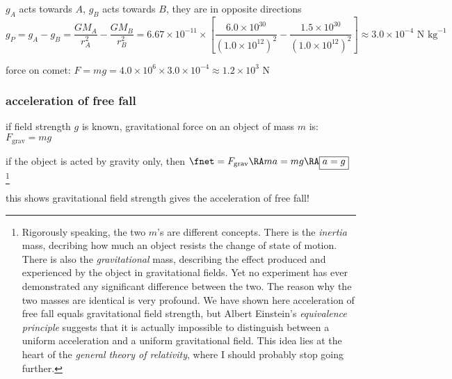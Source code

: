 \sol $g_A$ acts towards $A$, $g_B$ acts towards $B$, they are in opposite directions
\begin{equation*}
	g_P = g_A - g_B = \frac{GM_A}{r_A^2} - \frac{GM_B}{r_B^2} = 6.67\times10^{-11} \times\left[ \frac{6.0\times10^{30}}{(1.0\times10^{12})^2} - \frac{1.5\times10^{30}}{(1.0\times10^{12})^2}\right] \approx 3.0\times10^{-4} \text{ N kg}^{-1}
\end{equation*}

force on comet: $F=mg = 4.0\times10^6 \times 3.0\times10^{-4} \approx 1.2\times10^3 \text{ N}$ \eoe

\subsubsection{acceleration of free fall}

if field strength $g$ is known, gravitational force on an object of mass $m$ is: $F_\text{grav} = mg$

if the object is acted by gravity only, then $\fnet = F_\text{grav} \RA ma = mg \RA \boxed{a=g}$
\footnote{Rigorously speaking, the two $m$'s are different concepts. There is the \emph{inertia} mass, decribing how much an object resists the change of state of motion. There is also the \emph{gravitational} mass, describing the effect produced and experienced by the object in gravitational fields. Yet no experiment has ever demonstrated any significant difference between the two. The reason why the two masses are identical is very profound. We have shown here acceleration of free fall equals gravitational field strength, but Albert Einstein's \emph{equivalence principle} suggests that it is actually impossible to distinguish between a uniform acceleration and a uniform gravitational field. This idea lies at the heart of the \emph{general theory of relativity}, where I should probably stop going further.}

this shows gravitational field strength gives the acceleration of free fall!


